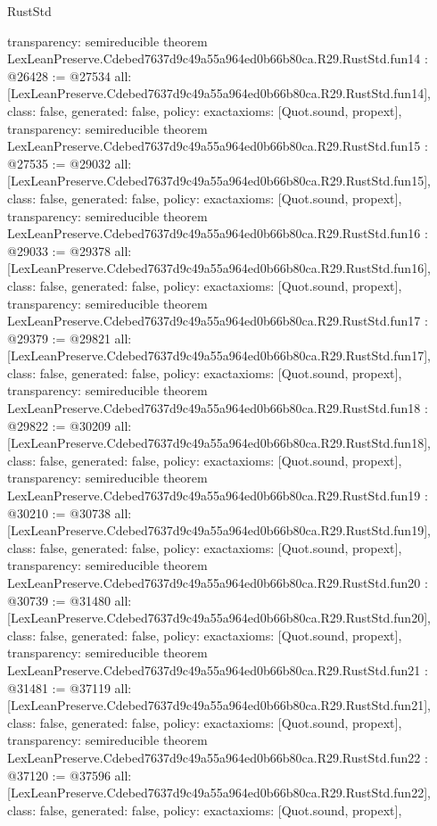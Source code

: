 \begin{lexlean}{RustStd}
\begin{coremodule}
{  transparency: semireducible
}
theorem LexLeanPreserve.Cdebed7637d9c49a55a964ed0b66b80ca.R29.RustStd.fun14 : @26428 := @27534 {
  all: [LexLeanPreserve.Cdebed7637d9c49a55a964ed0b66b80ca.R29.RustStd.fun14],
  class: false,
  generated: false,
  policy: exact{axioms: [Quot.sound, propext]},
  transparency: semireducible
}
theorem LexLeanPreserve.Cdebed7637d9c49a55a964ed0b66b80ca.R29.RustStd.fun15 : @27535 := @29032 {
  all: [LexLeanPreserve.Cdebed7637d9c49a55a964ed0b66b80ca.R29.RustStd.fun15],
  class: false,
  generated: false,
  policy: exact{axioms: [Quot.sound, propext]},
  transparency: semireducible
}
theorem LexLeanPreserve.Cdebed7637d9c49a55a964ed0b66b80ca.R29.RustStd.fun16 : @29033 := @29378 {
  all: [LexLeanPreserve.Cdebed7637d9c49a55a964ed0b66b80ca.R29.RustStd.fun16],
  class: false,
  generated: false,
  policy: exact{axioms: [Quot.sound, propext]},
  transparency: semireducible
}
theorem LexLeanPreserve.Cdebed7637d9c49a55a964ed0b66b80ca.R29.RustStd.fun17 : @29379 := @29821 {
  all: [LexLeanPreserve.Cdebed7637d9c49a55a964ed0b66b80ca.R29.RustStd.fun17],
  class: false,
  generated: false,
  policy: exact{axioms: [Quot.sound, propext]},
  transparency: semireducible
}
theorem LexLeanPreserve.Cdebed7637d9c49a55a964ed0b66b80ca.R29.RustStd.fun18 : @29822 := @30209 {
  all: [LexLeanPreserve.Cdebed7637d9c49a55a964ed0b66b80ca.R29.RustStd.fun18],
  class: false,
  generated: false,
  policy: exact{axioms: [Quot.sound, propext]},
  transparency: semireducible
}
theorem LexLeanPreserve.Cdebed7637d9c49a55a964ed0b66b80ca.R29.RustStd.fun19 : @30210 := @30738 {
  all: [LexLeanPreserve.Cdebed7637d9c49a55a964ed0b66b80ca.R29.RustStd.fun19],
  class: false,
  generated: false,
  policy: exact{axioms: [Quot.sound, propext]},
  transparency: semireducible
}
theorem LexLeanPreserve.Cdebed7637d9c49a55a964ed0b66b80ca.R29.RustStd.fun20 : @30739 := @31480 {
  all: [LexLeanPreserve.Cdebed7637d9c49a55a964ed0b66b80ca.R29.RustStd.fun20],
  class: false,
  generated: false,
  policy: exact{axioms: [Quot.sound, propext]},
  transparency: semireducible
}
theorem LexLeanPreserve.Cdebed7637d9c49a55a964ed0b66b80ca.R29.RustStd.fun21 : @31481 := @37119 {
  all: [LexLeanPreserve.Cdebed7637d9c49a55a964ed0b66b80ca.R29.RustStd.fun21],
  class: false,
  generated: false,
  policy: exact{axioms: [Quot.sound, propext]},
  transparency: semireducible
}
theorem LexLeanPreserve.Cdebed7637d9c49a55a964ed0b66b80ca.R29.RustStd.fun22 : @37120 := @37596 {
  all: [LexLeanPreserve.Cdebed7637d9c49a55a964ed0b66b80ca.R29.RustStd.fun22],
  class: false,
  generated: false,
  policy: exact{axioms: [Quot.sound, propext]},
}
\end{coremodule}
\end{lexlean}
